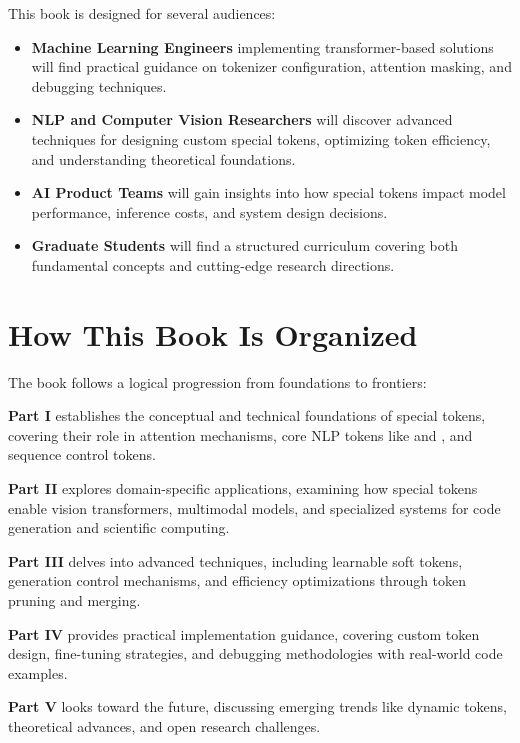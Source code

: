This book is designed for several audiences:

\begin{itemize}[leftmargin=*]
\item \textbf{Machine Learning Engineers} implementing transformer-based solutions will find practical guidance on tokenizer configuration, attention masking, and debugging techniques.

\item \textbf{NLP and Computer Vision Researchers} will discover advanced techniques for designing custom special tokens, optimizing token efficiency, and understanding theoretical foundations.

\item \textbf{AI Product Teams} will gain insights into how special tokens impact model performance, inference costs, and system design decisions.

\item \textbf{Graduate Students} will find a structured curriculum covering both fundamental concepts and cutting-edge research directions.
\end{itemize}

\section*{How This Book Is Organized}

The book follows a logical progression from foundations to frontiers:

\textbf{Part I} establishes the conceptual and technical foundations of special tokens, covering their role in attention mechanisms, core NLP tokens like \cls{} and \mask{}, and sequence control tokens.

\textbf{Part II} explores domain-specific applications, examining how special tokens enable vision transformers, multimodal models, and specialized systems for code generation and scientific computing.

\textbf{Part III} delves into advanced techniques, including learnable soft tokens, generation control mechanisms, and efficiency optimizations through token pruning and merging.

\textbf{Part IV} provides practical implementation guidance, covering custom token design, fine-tuning strategies, and debugging methodologies with real-world code examples.

\textbf{Part V} looks toward the future, discussing emerging trends like dynamic tokens, theoretical advances, and open research challenges.

